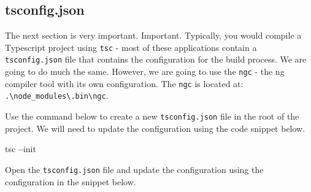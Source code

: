 \documentclass[]{book}
\newenvironment{Shaded}{\begin{snugshade}}{\end{snugshade}}
\newcommand{\OperatorTok}[1]{\textcolor[rgb]{0.81,0.36,0.00}{\textbf{#1}}}
\newcommand{\NormalTok}[1]{#1}
\theoremstyle{definition}
\theoremstyle{definition}
\theoremstyle{definition}
\theoremstyle{remark}
\begin{document}
\subsection{tsconfig.json}\label{tsconfig.json}

The next section is very important. Important. Typically, you would
compile a Typescript project using \texttt{tsc} - most of these
applications contain a \texttt{tsconfig.json} file that contains the
configuration for the build process. We are going to do much the same.
However, we are going to use the \texttt{ngc} - the ng compiler tool
with its own configuration. The \texttt{ngc} is located at:
\texttt{.\textbackslash{}node\_modules\textbackslash{}.bin\textbackslash{}ngc}.

Use the command below to create a new \texttt{tsconfig.json} file in the
root of the project. We will need to update the configuration using the
code snippet below.

\begin{Shaded}
\begin{Highlighting}[]
\NormalTok{tsc }\OperatorTok{--}\NormalTok{init}
\end{Highlighting}
\end{Shaded}

Open the \texttt{tsconfig.json} file and update the configuration using
the configuration in the snippet below.
\end{document}
